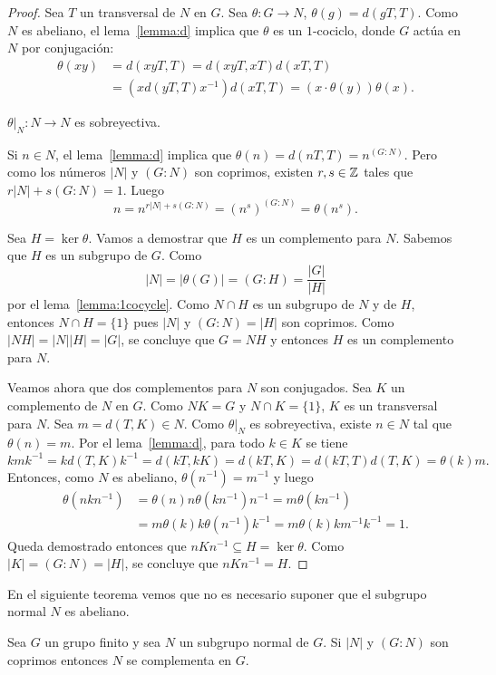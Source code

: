 \begin{proof}
	Sea $T$ un transversal de $N$ en $G$. Sea $\theta\colon G\to N$,
	$\theta(g)=d(gT,T)$. Como $N$ es abeliano, el lema~\ref{lemma:d} implica
	que $\theta$ es un $1$-cociclo, donde $G$ actúa en $N$ por conjugación:
	\begin{align*}
		\theta(xy)&=d(xyT,T)
		=d(xyT,xT)d(xT,T)\\
		&=(xd(yT,T)x^{-1})d(xT,T)=(x\cdot\theta(y))\theta(x).
	\end{align*}

	\begin{claim}
		$\theta|_N\colon N\to N$ es sobreyectiva.
	\end{claim}

	Si $n\in N$, el lema~\ref{lemma:d} implica que
	$\theta(n)=d(nT,T)=n^{(G:N)}$. Pero como los números $|N|$ y $(G:N)$ son
	coprimos, existen $r,s\in\mathbb{Z}$ tales que $r|N|+s(G:N)=1$. Luego
	\[
		n=n^{r|N|+s(G:N)}=(n^s)^{(G:N)}=\theta(n^s).
	\]

	Sea $H=\ker\theta$. Vamos a demostrar que $H$ es un complemento para $N$. 
	Sabemos que $H$ es un
	subgrupo de $G$. Como
	\[
		|N|=|\theta(G)|=(G:H)=\frac{|G|}{|H|}
	\]
	por el lema~\ref{lemma:1cocycle}.
	Como $N\cap H$ es un subgrupo de $N$ y de $H$, entonces $N\cap H=\{1\}$ pues
	$|N|$ y $(G:N)=|H|$ son coprimos.  Como $|NH|=|N||H|=|G|$, se concluye que
	$G=NH$ y entonces $H$ es un complemento para $N$.

	Veamos ahora que dos complementos para $N$ son conjugados. 
	Sea $K$ un complemento de $N$ en $G$. Como $NK=G$ y $N\cap K=\{1\}$, $K$ es un
	transversal para $N$. Sea $m=d(T,K)\in N$. Como $\theta|_N$ es
	sobreyectiva, existe $n\in N$ tal que $\theta(n)=m$. Por el
	lema~\ref{lemma:d}, para todo $k\in K$ se tiene
	\[
	kmk^{-1}=kd(T,K)k^{-1}=d(kT,kK)=d(kT,K)=d(kT,T)d(T,K)=\theta(k)m.
	\]
	Entonces, como $N$ es abeliano,
	$\theta(n^{-1})=m^{-1}$ y luego 
	\begin{align*}
		\theta(nkn^{-1})&=\theta(n)n\theta(kn^{-1})n^{-1}
		=m\theta(kn^{-1})\\
		&=m\theta(k)k\theta(n^{-1})k^{-1}
		=m\theta(k)km^{-1}k^{-1}=1.
	\end{align*}
	Queda demostrado entonces que $nKn^{-1}\subseteq H=\ker\theta$. Como
	$|K|=(G:N)=|H|$, se concluye que $nKn^{-1}=H$.
\end{proof}

En el siguiente teorema vemos que no es necesario suponer que el subgrupo
normal $N$ es abeliano.

\begin{theorem}
	\label{theorem:SchurZassenhaus}
	Sea $G$ un grupo finito y sea $N$ un subgrupo normal de $G$. Si $|N|$ y
	$(G:N)$ son coprimos entonces $N$ se complementa en $G$.
\end{theorem}

